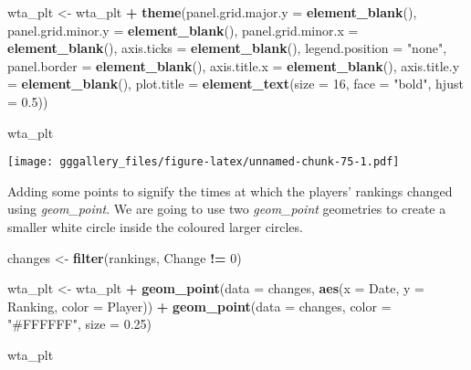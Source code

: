 \documentclass[]{book}
\newenvironment{Shaded}{\begin{snugshade}}{\end{snugshade}}
\newcommand{\DataTypeTok}[1]{\textcolor[rgb]{0.13,0.29,0.53}{#1}}
\newcommand{\DecValTok}[1]{\textcolor[rgb]{0.00,0.00,0.81}{#1}}
\newcommand{\FloatTok}[1]{\textcolor[rgb]{0.00,0.00,0.81}{#1}}
\newcommand{\KeywordTok}[1]{\textcolor[rgb]{0.13,0.29,0.53}{\textbf{#1}}}
\newcommand{\NormalTok}[1]{#1}
\newcommand{\OperatorTok}[1]{\textcolor[rgb]{0.81,0.36,0.00}{\textbf{#1}}}
\newcommand{\StringTok}[1]{\textcolor[rgb]{0.31,0.60,0.02}{#1}}
\begin{document}
\begin{Shaded}
\begin{Highlighting}[]
\NormalTok{wta_plt <-}\StringTok{ }\NormalTok{wta_plt }\OperatorTok{+}\StringTok{ }
\StringTok{  }\KeywordTok{theme}\NormalTok{(}\DataTypeTok{panel.grid.major.y =} \KeywordTok{element_blank}\NormalTok{(), }\DataTypeTok{panel.grid.minor.y =} \KeywordTok{element_blank}\NormalTok{(),}
        \DataTypeTok{panel.grid.minor.x =} \KeywordTok{element_blank}\NormalTok{(), }\DataTypeTok{axis.ticks =} \KeywordTok{element_blank}\NormalTok{(), }
        \DataTypeTok{legend.position =} \StringTok{"none"}\NormalTok{, }\DataTypeTok{panel.border =} \KeywordTok{element_blank}\NormalTok{(),}
        \DataTypeTok{axis.title.x =} \KeywordTok{element_blank}\NormalTok{(), }\DataTypeTok{axis.title.y =} \KeywordTok{element_blank}\NormalTok{(),}
        \DataTypeTok{plot.title =} \KeywordTok{element_text}\NormalTok{(}\DataTypeTok{size =} \DecValTok{16}\NormalTok{, }\DataTypeTok{face =} \StringTok{"bold"}\NormalTok{, }\DataTypeTok{hjust =} \FloatTok{0.5}\NormalTok{)) }

\NormalTok{wta_plt}
\end{Highlighting}
\end{Shaded}

\texttt{[image: gggallery\_files/figure-latex/unnamed-chunk-75-1.pdf]}

Adding some points to signify the times at which the players' rankings changed using \emph{geom\_point}.
We are going to use two \emph{geom\_point} geometries to create a smaller white circle inside the coloured larger circles.

\begin{Shaded}
\begin{Highlighting}[]
\NormalTok{changes <-}\StringTok{ }\KeywordTok{filter}\NormalTok{(rankings, Change }\OperatorTok{!=}\StringTok{ }\DecValTok{0}\NormalTok{)}


\NormalTok{wta_plt <-}\StringTok{ }\NormalTok{wta_plt }\OperatorTok{+}\StringTok{ }\KeywordTok{geom_point}\NormalTok{(}\DataTypeTok{data =}\NormalTok{ changes, }\KeywordTok{aes}\NormalTok{(}\DataTypeTok{x =}\NormalTok{ Date, }\DataTypeTok{y =}\NormalTok{ Ranking, }\DataTypeTok{color =}\NormalTok{ Player)) }\OperatorTok{+}
\StringTok{  }\KeywordTok{geom_point}\NormalTok{(}\DataTypeTok{data =}\NormalTok{ changes, }\DataTypeTok{color =} \StringTok{"#FFFFFF"}\NormalTok{, }\DataTypeTok{size =} \FloatTok{0.25}\NormalTok{) }

\NormalTok{wta_plt}
\end{Highlighting}
\end{Shaded}
\end{document}
